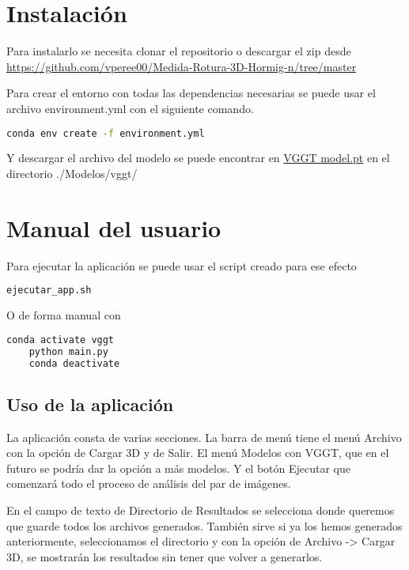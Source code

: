 \section{Instalación}
Para instalarlo se necesita clonar el repositorio o descargar el zip desde \href{https://github.com/vperee00/Medida-Rotura-3D-Hormig-n/tree/master}{https://github.com/vperee00/Medida-Rotura-3D-Hormig-n/tree/master}

Para crear el entorno con todas las dependencias necesarias se puede usar el archivo environment.yml con el siguiente comando.


\begin{lstlisting}[language=bash]
	conda env create -f environment.yml
\end{lstlisting}

Y descargar el archivo del modelo se puede encontrar en \href{https://huggingface.co/facebook/VGGT-1B/blob/main/model.pt}{VGGT model.pt} en el directorio ./Modelos/vggt/

\section{Manual del usuario}
Para ejecutar la aplicación se puede usar el script creado para ese efecto

\begin{lstlisting}[language=bash]
	ejecutar_app.sh
\end{lstlisting}

O de forma manual con 
\begin{lstlisting}[language=bash]
	conda activate vggt
	python main.py
	conda deactivate
\end{lstlisting}

\subsection{Uso de la aplicación}
La aplicación consta de varias secciones. La barra de menú tiene el menú Archivo con la opción de Cargar 3D y de Salir. El menú Modelos con VGGT, que en el futuro se podría dar la opción a más modelos. Y el botón Ejecutar que comenzará todo el proceso de análisis del par de imágenes.


En el campo de texto de Directorio de Resultados se selecciona donde queremos que guarde todos los archivos generados. También sirve si ya los hemos generados anteriormente, seleccionamos el directorio y con la opción de Archivo -> Cargar 3D, se mostrarán los resultados sin tener que volver a generarlos.

